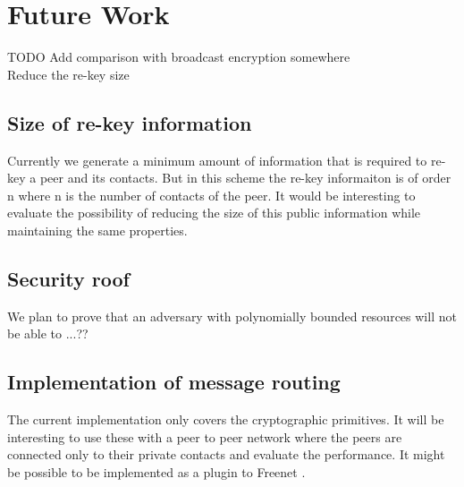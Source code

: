 \section{Future Work}

TODO Add comparison with broadcast encryption somewhere\\

Reduce the re-key size\\
\subsection{Size of re-key information}
Currently we generate a minimum amount of information that is required to re-key a peer and its contacts. But in this scheme the re-key informaiton is of order n where n is the number of contacts of the peer. It would be interesting to evaluate the possibility of reducing the size of this public information while maintaining the same properties.

\subsection{Security roof}
We plan to prove that an adversary with polynomially bounded resources will not be able to ...??

\subsection{Implementation of message routing}
The current implementation only covers the cryptographic primitives. It will be interesting to use these with a peer to peer network where the peers are connected only to their private contacts and evaluate the performance. It might be possible to be implemented as a plugin to Freenet \cite{freenet}.
